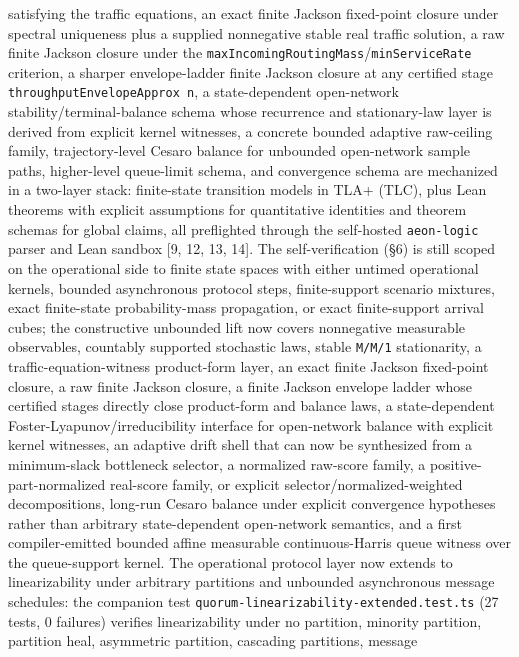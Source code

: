 \documentclass[
  11pt,
]{article}
\begin{document}
satisfying the traffic equations, an exact finite Jackson fixed-point
closure under spectral uniqueness plus a supplied nonnegative stable
real traffic solution, a raw finite Jackson closure under the
\texttt{maxIncomingRoutingMass}/\texttt{minServiceRate} criterion, a
sharper envelope-ladder finite Jackson closure at any certified stage
\texttt{throughputEnvelopeApprox\ n}, a state-dependent open-network
stability/terminal-balance schema whose recurrence and stationary-law
layer is derived from explicit kernel witnesses, a concrete bounded
adaptive raw-ceiling family, trajectory-level Cesaro balance for
unbounded open-network sample paths, higher-level queue-limit schema,
and convergence schema are mechanized in a two-layer stack: finite-state
transition models in TLA+ (TLC), plus Lean theorems with explicit
assumptions for quantitative identities and theorem schemas for global
claims, all preflighted through the self-hosted \texttt{aeon-logic}
parser and Lean sandbox {[}9, 12, 13, 14{]}. The self-verification (§6)
is still scoped on the operational side to finite state spaces with
either untimed operational kernels, bounded asynchronous protocol steps,
finite-support scenario mixtures, exact finite-state probability-mass
propagation, or exact finite-support arrival cubes; the constructive
unbounded lift now covers nonnegative measurable observables, countably
supported stochastic laws, stable \texttt{M/M/1} stationarity, a
traffic-equation-witness product-form layer, an exact finite Jackson
fixed-point closure, a raw finite Jackson closure, a finite Jackson
envelope ladder whose certified stages directly close product-form and
balance laws, a state-dependent Foster-Lyapunov/irreducibility interface
for open-network balance with explicit kernel witnesses, an adaptive
drift shell that can now be synthesized from a minimum-slack bottleneck
selector, a normalized raw-score family, a positive-part-normalized
real-score family, or explicit selector/normalized-weighted
decompositions, long-run Cesaro balance under explicit convergence
hypotheses rather than arbitrary state-dependent open-network semantics,
and a first compiler-emitted bounded affine measurable continuous-Harris
queue witness over the queue-support kernel. The operational protocol
layer now extends to linearizability under arbitrary partitions and
unbounded asynchronous message schedules: the companion test
\texttt{quorum-linearizability-extended.test.ts} (27 tests, 0 failures)
verifies linearizability under no partition, minority partition,
partition heal, asymmetric partition, cascading partitions, message
\end{document}

